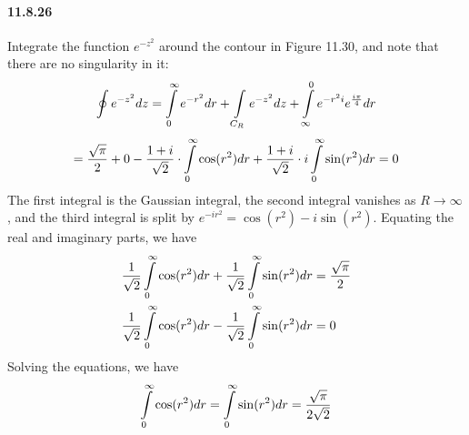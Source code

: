 \documentclass[a4paper]{article}
\begin{document}
\paragraph{11.8.26}
Integrate the function $e^{-z^2}$ around the contour in Figure 11.30, and note that there are no singularity in it:
\[
\oint e^{-z^2}dz=\int\displaylimits_0^\infty e^{-r^2}dr+\int\displaylimits_{C_R}e^{-z^2}dz+\int\displaylimits_\infty^0 e^{-r^2i}e^{\frac{i\pi}{4}}dr
\]
\[
=\frac{\sqrt{\pi}}{2}+0-\frac{1+i}{\sqrt{2}}\cdot\int\displaylimits_0^\infty\cos(r^2)dr+\frac{1+i}{\sqrt{2}}\cdot i\int\displaylimits_{0}^\infty\sin(r^2)dr=0
\]
The first integral is the Gaussian integral, the second integral vanishes as $R\to\infty$, and the third integral is split by $e^{-ir^2}=\cos(r^2)-i\sin(r^2)$. Equating the real and imaginary parts, we have
\begin{align*}
    & \frac{1}{\sqrt{2}}\int\displaylimits_0^\infty\cos(r^2)dr+\frac{1}{\sqrt{2}}\int\displaylimits_0^\infty\sin(r^2)dr=\frac{\sqrt{\pi}}{2}\\
    & \frac{1}{\sqrt{2}}\int\displaylimits_0^\infty\cos(r^2)dr-\frac{1}{\sqrt{2}}\int\displaylimits_0^\infty\sin(r^2)dr=0
\end{align*}
Solving the equations, we have
\[
\int\displaylimits_0^\infty\cos(r^2)dr=\int\displaylimits_0^\infty\sin(r^2)dr=\frac{\sqrt{\pi}}{2\sqrt{2}}
\]
\end{document}
